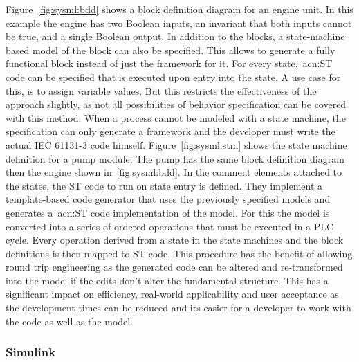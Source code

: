 Figure~\ref{fig:sysml:bdd} shows a block definition diagram for an engine unit.
In this example the engine has two Boolean inputs, an invariant that both inputs cannot be true, and a single Boolean output.
In addition to the blocks, a state-machine based model of the block can also be specified.
This allows to generate a fully functional block instead of just the framework for it.
For every state,~\acrshort{acn:ST} code can be specified that is executed upon entry into the state.
A use case for this, is to assign variable values.
But this restricts the effectiveness of the approach slightly, as not all possibilities of behavior specification can be covered with this method.
When a process cannot be modeled with a state machine, the specification can only generate a framework and the developer must write the actual IEC 61131-3 code himself.
Figure~\ref{fig:sysml:stm} shows the state machine definition for a pump module.
The pump has the same block definition diagram then the engine shown in~\ref{fig:sysml:bdd}.
In the comment elements attached to the states, the ST code to run on state entry is defined.
They implement a template-based code generator that uses the previously specified models and generates a~\acrshort{acn:ST} code implementation of the model.
For this the model is converted into a series of ordered operations that must be executed in a PLC cycle.
Every operation derived from a state in the state machines and the block definitions is then mapped to ST code.
This procedure has the benefit of allowing round trip engineering as the generated code can be altered and re-transformed into the model if the edits don't alter the fundamental structure.
This has a significant impact on efficiency, real-world applicability and user acceptance as the development times can be reduced and its easier for a developer to work with the code as well as the model.

\subsubsection{Simulink}
\label{sec:sub:simulink}


